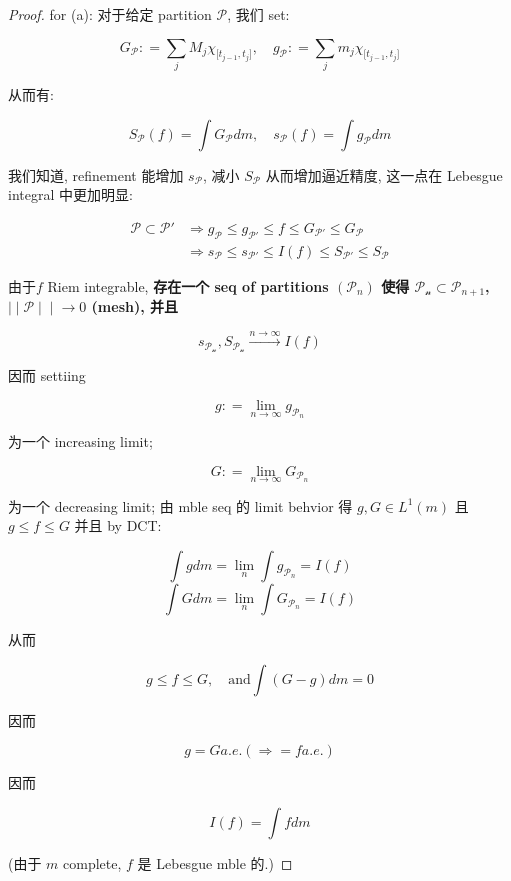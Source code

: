 \documentclass{qlnotes-export}
\begin{document}
\begin{proof}

for (a): 对于给定 partition \(\mathcal{P}\), 我们 set:

\[G_{\mathcal{P}}: = \sum\limits_{j}M_{j}\chi_{\lbrack t_{j - 1},t_{j}\rbrack},\quad g_{\mathcal{P}}: = \sum\limits_{j}m_{j}\chi_{\lbrack t_{j - 1},t_{j}\rbrack}\]

从而有:

\[S_{\mathcal{P}}(f) = \int G_{\mathcal{P}} dm,\quad s_{\mathcal{P}}(f) = \int g_{\mathcal{P}} dm\]

我们知道, refinement 能增加 \(s_{\mathcal{P}}\), 减小 \(S_{\mathcal{P}}\) 从而增加逼近精度, 这一点在 Lebesgue integral 中更加明显:

\[\begin{matrix}
{\mathcal{P} \subset \mathcal{P}'} & {\Longrightarrow g_{\mathcal{P}} \leq g_{\mathcal{P}'} \leq f \leq G_{\mathcal{P}'} \leq G_{\mathcal{P}}} \\
 & {\Longrightarrow s_{\mathcal{P}} \leq s_{\mathcal{P}'} \leq I(f) \leq S_{\mathcal{P}'} \leq S_{\mathcal{P}}}
\end{matrix}\]

由于\(f\) Riem integrable, \textbf{存在一个 seq of partitions \((\mathcal{P}_{n})\) 使得 \(\mathcal{P}_{\mathcal{n}} \subset \mathcal{P}_{n + 1}\), \(\left. | \middle| \mathcal{P} \middle| \middle| \rightarrow 0 \right.\) (mesh), 并且}

\[s_{\mathcal{P}_{\mathcal{n}}},S_{\mathcal{P}_{\mathcal{n}}}\overset{n\rightarrow\infty}{\rightarrow}I(f)\]

因而 settiing

\[g: = \lim\limits_{n\rightarrow\infty}g_{\mathcal{P}_{n}}\]

为一个 increasing limit;

\[G: = \lim\limits_{n\rightarrow\infty}G_{\mathcal{P}_{n}}\]

为一个 decreasing limit; 由 mble seq 的 limit behvior 得 \(g,G \in L^{1}(m)\) 且 \(g \leq f \leq G\) 并且 by DCT:

\[\int g dm = \lim\limits_{n}\int g_{\mathcal{P}_{n}} = I(f)\]\[\int G dm = \lim\limits_{n}\int G_{\mathcal{P}_{n}} = I(f)\]

从而

\[g \leq f \leq G,\quad\text{and}\int(G - g) dm = 0\]

因而

\[g = G a.e.(\Longrightarrow = f a.e.)\]

因而

\[I(f) = \int f dm\]

(由于 \(m\) complete, \(f\) 是 Lebesgue mble 的.)

\end{proof}
\end{document}
